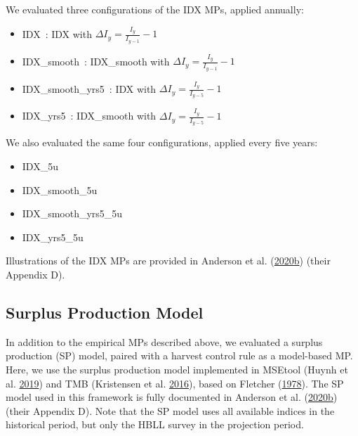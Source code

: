 \documentclass[11pt]{book}
\begin{document}
We evaluated three configurations of the IDX MPs, applied annually:
\begin{itemize}
\item
  IDX~: IDX with \(\Delta I_y = \frac{I_y}{I_{y-1}} -1\)
\item
  IDX\_smooth~: IDX\_smooth with \(\Delta I_y = \frac{I_y}{I_{y-1}} -1\)
\item
  IDX\_smooth\_yrs5~: IDX with \(\Delta I_y = \frac{I_y}{I_{y-5}} -1\)
\item
  IDX\_yrs5~: IDX\_smooth with \(\Delta I_y = \frac{I_y}{I_{y-5}} -1\)
\end{itemize}
We also evaluated the same four configurations, applied every five years:
\begin{itemize}
\item
  IDX\_5u
\item
  IDX\_smooth\_5u
\item
  IDX\_smooth\_yrs5\_5u
\item
  IDX\_yrs5\_5u
\end{itemize}
Illustrations of the IDX MPs are provided in Anderson et al. (\protect\hyperlink{ref-anderson2020gfmp}{2020}\protect\hyperlink{ref-anderson2020gfmp}{b}) (their Appendix D).

\hypertarget{sec:mp-model-based}{%
\label{sec:mp-model-based}}

\hypertarget{sec:mp-sp}{%
\subsection{Surplus Production Model}\label{sec:mp-sp}}

In addition to the empirical MPs described above, we evaluated a surplus production (SP) model, paired with a harvest control rule as a model-based MP. Here, we use the surplus production model implemented in MSEtool (Huynh et al. \protect\hyperlink{ref-huynh_msetool_2019}{2019}) and TMB (Kristensen et al. \protect\hyperlink{ref-tmb}{2016}), based on Fletcher (\protect\hyperlink{ref-fletcher1978}{1978}). The SP model used in this framework is fully documented in Anderson et al. (\protect\hyperlink{ref-anderson2020gfmp}{2020}\protect\hyperlink{ref-anderson2020gfmp}{b}) (their Appendix D). Note that the SP model uses all available indices in the historical period, but only the HBLL survey in the projection period.
\end{document}

